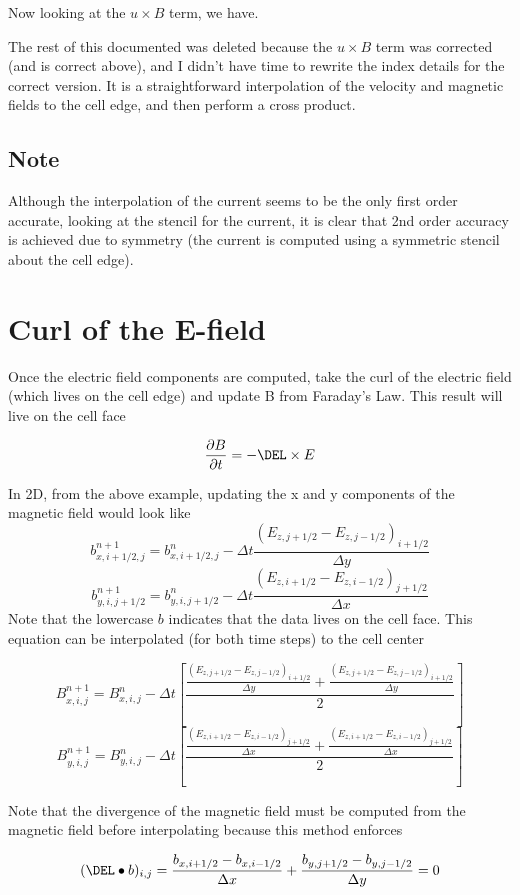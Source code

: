 \documentclass[11pt]{article}
\begin{document}
Now looking at the $u\times B$ term, we have.

The rest of this documented was deleted because the $u \times B$ term was corrected (and is correct above), and I didn't have time to rewrite the index details for the correct version. It is a straightforward interpolation of the velocity and magnetic fields to the cell edge, and then perform a cross product.


\subsection{Note}
Although the interpolation of the current seems to be the only first order accurate, looking at the stencil for the current, it is clear that 2nd order accuracy is achieved due to symmetry (the current is computed using a symmetric stencil about the cell edge).

\section{Curl of the E-field}
Once the electric field components are computed, take the curl of the electric field (which lives on the cell edge) and update B from Faraday's Law. This result will live on the cell face

\begin{equation}
	\frac{\partial B}{\partial t} = - \DEL \times E
\end{equation}

In 2D, from the above example, updating the x and y components of the magnetic field would look like
\begin{equation}
	b_{x,i+1/2,j}^{n+1} = b_{x,i+1/2,j}^{n} -
	\Delta t
	\frac{(E_{z,j+1/2}-E_{z,j-1/2})_{i+1/2}}{\Delta y}
\end{equation}
\begin{equation}
	b_{y,i,j+1/2}^{n+1} = b_{y,i,j+1/2}^{n} -
	\Delta t
	\frac{(E_{z,i+1/2}-E_{z,i-1/2})_{j+1/2}}{\Delta x}
\end{equation}
Note that the lowercase $b$ indicates that the data lives on the cell face. This equation can be interpolated (for both time steps) to the cell center

\begin{equation}
	B_{x,i,j}^{n+1} = B_{x,i,j}^{n} -
	\Delta t
	\left[
	\frac{\frac{(E_{z,j+1/2}-E_{z,j-1/2})_{i+1/2}}{\Delta y}
	+
	\frac{(E_{z,j+1/2}-E_{z,j-1/2})_{i+1/2}}{\Delta y}}{2}
	\right]
\end{equation}
\begin{equation}
	B_{y,i,j}^{n+1} = B_{y,i,j}^{n} -
	\Delta t
	\left[
	\frac{\frac{(E_{z,i+1/2}-E_{z,i-1/2})_{j+1/2}}{\Delta x}
	+
	\frac{(E_{z,i+1/2}-E_{z,i-1/2})_{j+1/2}}{\Delta x}}{2}
	\right]
\end{equation}

Note that the divergence of the magnetic field must be computed from the magnetic field before interpolating because this method enforces

\begin{equation}
	(\DEL \bullet b)_{i,j} =
	\frac{b_{x,i+1/2}-b_{x,i-1/2}}{\Delta x}
	+
	\frac{b_{y,j+1/2}-b_{y,j-1/2}}{\Delta y}
	=
	0
\end{equation}
\end{document}

